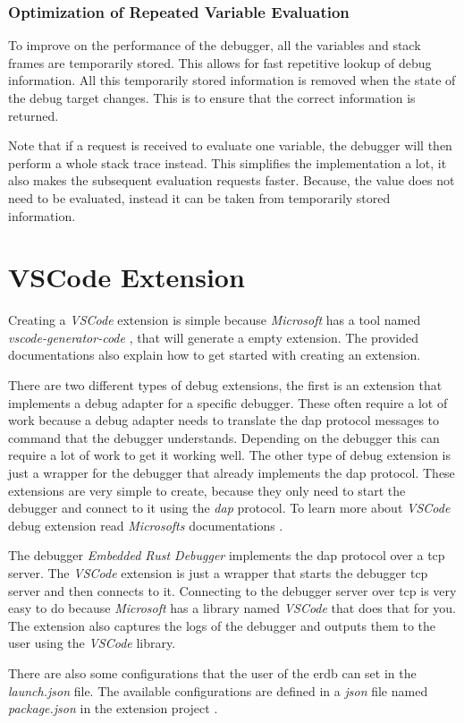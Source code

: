 \subsubsection{Optimization of Repeated Variable Evaluation}
To improve on the performance of the debugger, all the variables and stack frames are temporarily stored.
This allows for fast repetitive lookup of debug information.
All this temporarily stored information is removed when the state of the debug target changes.
This is to ensure that the correct information is returned.


Note that if a request is received to evaluate one variable, the debugger will then perform a whole stack trace instead.
This simplifies the implementation a lot, it also makes the subsequent evaluation requests faster.
Because, the value does not need to be evaluated, instead it can be taken from temporarily stored information.



\section{VSCode Extension}
Creating a \emph{VSCode} extension is simple because \emph{Microsoft} has a tool named \emph{vscode-generator-code} \cite{vscode-generator-code}, that will generate a empty extension.
The provided documentations also explain how to get started with creating an extension.


There are two different types of debug extensions, the first is an extension that implements a debug adapter for a specific debugger.
These often require a lot of work because a debug adapter needs to translate the \gls{dap} protocol messages to command that the debugger understands.
Depending on the debugger this can require a lot of work to get it working well.
The other type of debug extension is just a wrapper for the debugger that already implements the \gls{dap} protocol.
These extensions are very simple to create, because they only need to start the debugger and connect to it using the \emph{dap} protocol.
To learn more about \emph{VSCode} debug extension read \emph{Microsofts} documentations \cite{vscode-debugger-extension-doc}.


The debugger \emph{Embedded Rust Debugger} implements the \gls{dap} protocol over a \gls{tcp} server.
The \emph{VSCode} extension is just a wrapper that starts the debugger \gls{tcp} server and then connects to it.
Connecting to the debugger server over \gls{tcp} is very easy to do because \emph{Microsoft} has a library named \emph{VSCode} that does that for you.
The extension also captures the logs of the debugger and outputs them to the user using the \emph{VSCode} library.


There are also some configurations that the user of the \gls{erdb} can set in the \emph{launch.json} file.
The available configurations are defined in a \emph{json} file named \emph{package.json} in the extension project \cite{erdb-vscode}.
